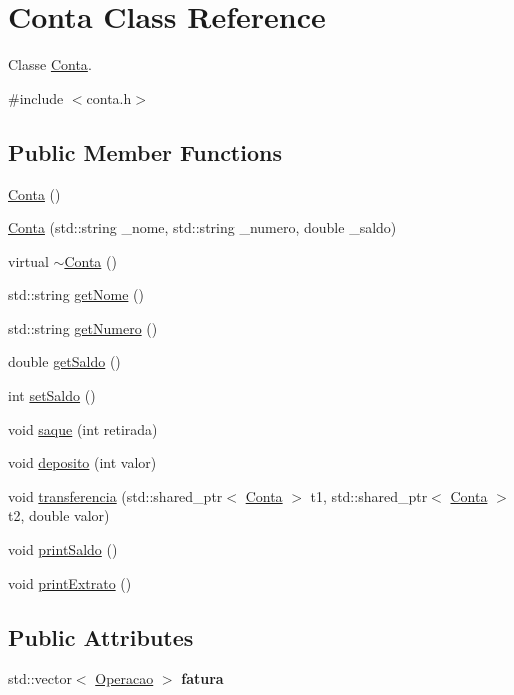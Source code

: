 \hypertarget{classConta}{}\section{Conta Class Reference}
\label{classConta}


Classe \hyperlink{classConta}{Conta}.  




{\ttfamily \#include $<$conta.\+h$>$}

\subsection*{Public Member Functions}
\begin{DoxyCompactItemize}
\item 
\hyperlink{classConta_ab22bc5e18f43b383aca57201ee68cb1e}{Conta} ()
\item 
\hyperlink{classConta_abb5206020d4d57b19f5285784781ade6}{Conta} (std\+::string \+\_\+nome, std\+::string \+\_\+numero, double \+\_\+saldo)
\item 
virtual \hyperlink{classConta_aa56e18d2c9eeb373cae18aab560b8261}{$\sim$\+Conta} ()
\item 
std\+::string \hyperlink{classConta_afb0c4a2741f4636648d962c78bc54a9a}{get\+Nome} ()
\item 
std\+::string \hyperlink{classConta_a955a7f08e45fce65f4d1ded10836a7b2}{get\+Numero} ()
\item 
double \hyperlink{classConta_a6db61cbaef5a054ef632597316a6aaf2}{get\+Saldo} ()
\item 
int \hyperlink{classConta_a2f7bbd9a98bb1e62b04bf9f2d2e126bf}{set\+Saldo} ()
\item 
void \hyperlink{classConta_a27d1541cad3d26df35ca230d6640cc85}{saque} (int retirada)
\item 
void \hyperlink{classConta_a1b6603aa8a3f0f667fae304521ab617e}{deposito} (int valor)
\item 
void \hyperlink{classConta_a92552b6c27a145002ffc247b9835834b}{transferencia} (std\+::shared\+\_\+ptr$<$ \hyperlink{classConta}{Conta} $>$ t1, std\+::shared\+\_\+ptr$<$ \hyperlink{classConta}{Conta} $>$ t2, double valor)
\item 
void \hyperlink{classConta_a00065eb73daf114c929f775b4750324b}{print\+Saldo} ()
\item 
void \hyperlink{classConta_a39bd0d37b4c2e613542c3d7e794d5059}{print\+Extrato} ()
\end{DoxyCompactItemize}
\subsection*{Public Attributes}
\begin{DoxyCompactItemize}
\item 
\mbox{\label{classConta_a34c742110e6fd3b0297e3dc1ac10ab6a}} 
std\+::vector$<$ \hyperlink{classOperacao}{Operacao} $>$ {\bfseries fatura}
\end{DoxyCompactItemize}
